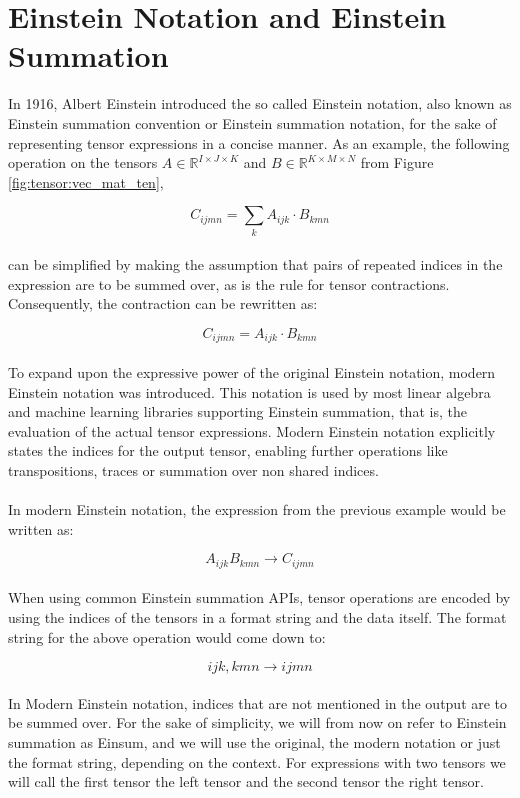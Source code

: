 \section{Einstein Notation and Einstein Summation}
In 1916, Albert Einstein introduced the so called Einstein notation, also known as
Einstein summation convention or Einstein summation notation, for the sake of
representing tensor expressions in a concise manner. As an example, the following
operation on the tensors $A \in \mathbb{R}^{I \times J \times K}$ and
$B \in \mathbb{R}^{K \times M \times N}$ from Figure \ref{fig:tensor:vec_mat_ten},

\[C_{ijmn} = \sum_{k}A_{ijk} \cdot B_{kmn}\]
\noindent
\\
can be simplified by making the assumption that pairs of repeated indices in the expression
are to be summed over, as is the rule for tensor contractions. Consequently, the contraction
can be rewritten as:

\[C_{ijmn} = A_{ijk} \cdot B_{kmn}\]
\noindent
\\
To expand upon the expressive power of the original Einstein notation, modern Einstein
notation was introduced. This notation is used by most linear algebra and machine
learning libraries supporting Einstein summation, that is, the evaluation of the actual
tensor expressions. Modern Einstein notation explicitly states the indices for the
output tensor, enabling further operations like transpositions, traces or summation
over non shared indices. 
\\
\\
In modern Einstein notation, the expression from the previous example would be written as:

\[A_{ijk}B_{kmn} \rightarrow C_{ijmn}\]
\noindent
\\
When using common Einstein summation APIs, tensor operations are encoded by using the
indices of the tensors in a format string and the data itself. The format string for 
the above operation would come down to:

\[ijk,kmn \rightarrow ijmn\]
\noindent
\\
In Modern Einstein notation, indices that are not mentioned in the output are to be
summed over. For the sake of simplicity, we will from now on refer to Einstein summation
as Einsum, and we will use the original, the modern notation or just the format
string, depending on the context. For expressions with two tensors we will call the first
tensor the left tensor and the second tensor the right tensor.

